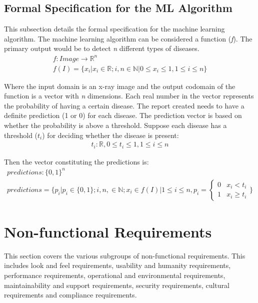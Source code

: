 \documentclass[12pt]{article}
\begin{document}
\subsection{Formal Specification for the ML Algorithm}
This subsection details the formal specification for the machine learning algorithm.
The machine learning algorithm can be considered a function (\textit{f}).
The primary output would be to detect \textit{n} different types of diseases.
\begin{gather*}
    f:Image \rightarrow \mathbb{R}^n \\
    f(I) = \{x_i | x_i \in \mathbb{R}; i, n \in \mathbb{N} | 0 \le x_i \le 1, 1 \le i \le n\}
\end{gather*}
 
\noindent Where the input domain is an x-ray image and the output codomain of the function is a vector with \textit{n} dimensions.
Each real number in the vector represents the probability of having a certain disease. 
The report created needs to have a definite prediction (1 or 0) for each disease. The prediction vector is based on whether the probability is above a threshold.  
Suppose each disease has a threshold ($t_i$) for deciding whether the disease is present: 
\begin{align*}
    t_i: \mathbb{R}, 0 \le t_i \le 1, 1 \le i \le n
\end{align*}

\noindent Then the vector constituting the predictions is:
\begin{gather*}
    predictions: \{0,1\}^n \\
    predictions = \Biggl\{ p_i \big| p_i \in \{ 0, 1 \}; i, n, \in \mathbb{N}; x_i \in f(I) \big| 1 \le i \le n, p_i =
    \begin{cases}
        0 & x_i < t_i \\
        1 & x_i \ge t_i
    \end{cases}
    \Biggr\}
\end{gather*}

\section{Non-functional Requirements}
This section covers the various subgroups of non-functional requirements. This includes
look and feel requirements, usability and humanity requirements, performance requirements,
operational and environmental requirements, maintainability and support requirements,
security requirements, cultural requirements and compliance requirements.
\end{document}
